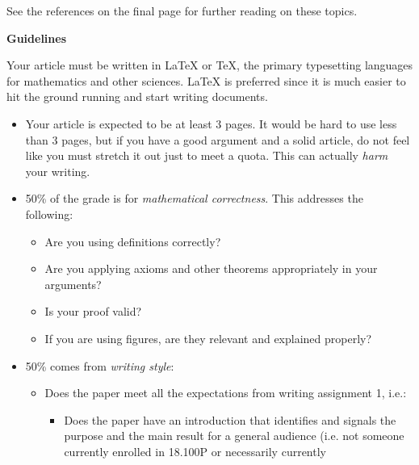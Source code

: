 \documentclass{article}
\begin{document}
    See the references on the final page for further reading on these topics.
    \par\hfill\par
    \textbf{\Large{Guidelines}}
    \par\hfill\par
    Your article must be written in \LaTeX{} or \TeX, the primary typesetting
    languages for mathematics and other sciences. \LaTeX{} is preferred since it
    is much easier to hit the ground running and start writing documents.
    \begin{itemize}
        \item
            Your article is expected to be at least 3 pages.
            It would be hard to use less than 3 pages, but if you have
            a good argument and a solid article, do not feel like you
            must stretch it out just to meet a quota. This can actually
            \textit{harm} your writing.
        \item
            50\% of the grade is for \textit{mathematical correctness}.
            This addresses the following:
            \begin{itemize}
                \item
                    Are you using definitions correctly?
                \item
                    Are you applying axioms and other theorems
                    appropriately in your arguments?
                \item
                    Is your proof valid?
                \item
                    If you are using figures, are they relevant and explained
                    properly?
            \end{itemize}
        \item
            50\% comes from \textit{writing style}:
            \begin{itemize}
                \item
                    Does the paper meet all the expectations
                    from writing assignment 1, i.e.:
                    \begin{itemize}
                        \item
                            Does the paper have an introduction that identifies
                            and signals the purpose and the main result for a
                            general audience (i.e. not someone currently
                            enrolled in 18.100P or necessarily currently

\end{itemize}
\end{itemize}
\end{itemize}
\end{document}
